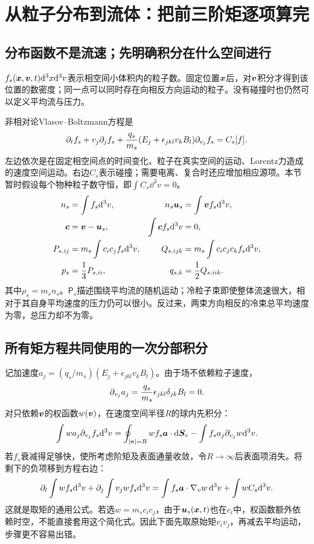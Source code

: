 \section{从粒子分布到流体：把前三阶矩逐项算完}
\label{sec:tutorial-moments}
\subsection{分布函数不是流速；先明确积分在什么空间进行}
$f_s(\bm{x},\bm{v},t)\mathrm d^3x\mathrm d^3v$表示相空间小体积内的粒子数。固定位置$\bm{x}$后，对$\bm{v}$积分才得到该位置的数密度；同一点可以同时存在向相反方向运动的粒子。没有碰撞时也仍然可以定义平均流与压力。

非相对论Vlasov--Boltzmann方程是
\begin{equation}
 \partial_tf_s+v_j\partial_jf_s+
 {q_s\over m_s}(E_j+\epsilon_{jkl}v_kB_l)\partial_{v_j}f_s=C_s[f].
 \label{eq:vlasov}
\end{equation}
左边依次是在固定相空间点的时间变化、粒子在真实空间的运动、Lorentz力造成的速度空间运动。右边$C_s$表示碰撞；需要电离、复合时还应增加相应源项。本节暂时假设每个物种粒子数守恒，即$\int C_s\dd^3v=0$。
\begin{align}
 n_s&=\int f_s\mathrm d^3v,&
 n_s\bm{u}_s&=\int\bm{v} f_s\mathrm d^3v,\\
 \bm{c}&=\bm{v}-\bm{u}_s,&
 \int\bm{c} f_s\mathrm d^3v&=0,\\
 P_{s,ij}&=m_s\int c_ic_j f_s\mathrm d^3v,&
 Q_{s,ijk}&=m_s\int c_ic_jc_k f_s\mathrm d^3v,\\
 p_s&={1\over3}P_{s,ii},&
 q_{s,k}&={1\over2}Q_{s,iik}.
\end{align}
其中$\rho_s=m_sn_s$。$\mathsf P_s$描述围绕平均流的随机运动；冷粒子束即使整体流速很大，相对于其自身平均速度的压力仍可以很小。反过来，两束方向相反的冷束总平均速度为零，总压力却不为零。

\subsection{所有矩方程共同使用的一次分部积分}
记加速度$a_j=(q_s/m_s)(E_j+\epsilon_{jkl}v_kB_l)$。由于场不依赖粒子速度，
\begin{equation}
 \partial_{v_j}a_j={q_s\over m_s}\epsilon_{jkl}\delta_{jk}B_l=0.
\end{equation}
对只依赖$\bm{v}$的权函数$w(\bm{v})$，在速度空间半径$R$的球内先积分：
\begin{equation}
 \int w a_j\partial_{v_j}f_s\mathrm d^3v
 =\oint_{|\bm{v}|=R}w f_s\bm{a}\cdot\mathrm d\bm{S}_v
 -\int f_s a_j\partial_{v_j}w\mathrm d^3v.
\end{equation}
若$f_s$衰减得足够快，使所考虑阶矩及表面通量收敛，令$R\to\infty$后表面项消失。将剩下的负项移到方程右边：
\begin{equation}
 \partial_t\int wf_s\mathrm d^3v+\partial_j\int v_jwf_s\mathrm d^3v
 =\int f_s\bm{a}\cdot\nabla_vw\,\mathrm d^3v+\int wC_s\mathrm d^3v.
 \label{eq:tutorial-mastermoment}
\end{equation}
这就是取矩的通用公式。若选$w=m_sc_ic_j$，由于$\bm{u}_s(\bm{x},t)$也在$c_i$中，权函数额外依赖时空，不能直接套用这个简化式。因此下面先取原始矩$v_iv_j$，再减去平均运动，步骤更不容易出错。

